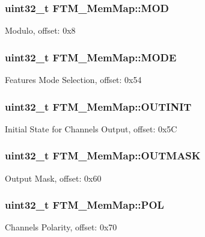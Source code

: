 \subsubsection[{M\+O\+D}]{\setlength{\rightskip}{0pt plus 5cm}uint32\+\_\+t F\+T\+M\+\_\+\+Mem\+Map\+::\+M\+O\+D}\label{struct_f_t_m___mem_map_a5ad801f060851969c07a2c3f3a108ade}
Modulo, offset\+: 0x8 \hypertarget{struct_f_t_m___mem_map_a1cabc42a484f2abbd67af1345b90fcc4}{}
\subsubsection[{M\+O\+D\+E}]{\setlength{\rightskip}{0pt plus 5cm}uint32\+\_\+t F\+T\+M\+\_\+\+Mem\+Map\+::\+M\+O\+D\+E}\label{struct_f_t_m___mem_map_a1cabc42a484f2abbd67af1345b90fcc4}
Features Mode Selection, offset\+: 0x54 \hypertarget{struct_f_t_m___mem_map_aacdd40604d98720d58618c5e9f0fb0fd}{}
\subsubsection[{O\+U\+T\+I\+N\+I\+T}]{\setlength{\rightskip}{0pt plus 5cm}uint32\+\_\+t F\+T\+M\+\_\+\+Mem\+Map\+::\+O\+U\+T\+I\+N\+I\+T}\label{struct_f_t_m___mem_map_aacdd40604d98720d58618c5e9f0fb0fd}
Initial State for Channels Output, offset\+: 0x5\+C \hypertarget{struct_f_t_m___mem_map_a16b10477073d1a3822d96ea9f65752fe}{}
\subsubsection[{O\+U\+T\+M\+A\+S\+K}]{\setlength{\rightskip}{0pt plus 5cm}uint32\+\_\+t F\+T\+M\+\_\+\+Mem\+Map\+::\+O\+U\+T\+M\+A\+S\+K}\label{struct_f_t_m___mem_map_a16b10477073d1a3822d96ea9f65752fe}
Output Mask, offset\+: 0x60 \hypertarget{struct_f_t_m___mem_map_a3a9de308929bca0a0a9155f4222aadae}{}
\subsubsection[{P\+O\+L}]{\setlength{\rightskip}{0pt plus 5cm}uint32\+\_\+t F\+T\+M\+\_\+\+Mem\+Map\+::\+P\+O\+L}\label{struct_f_t_m___mem_map_a3a9de308929bca0a0a9155f4222aadae}
Channels Polarity, offset\+: 0x70 \hypertarget{struct_f_t_m___mem_map_a84f64d9ce40acaa01380dab13bc5b5ea}{}
